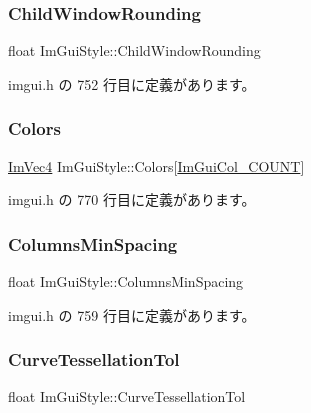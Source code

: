 \subsubsection{\texorpdfstring{Child\+Window\+Rounding}{ChildWindowRounding}}
{\footnotesize\ttfamily float Im\+Gui\+Style\+::\+Child\+Window\+Rounding}



 imgui.\+h の 752 行目に定義があります。

\mbox{\label{struct_im_gui_style_a2b4941240a38d1300c39a7fa4f03d0a3}} 
\subsubsection{\texorpdfstring{Colors}{Colors}}
{\footnotesize\ttfamily \mbox{\hyperlink{struct_im_vec4}{Im\+Vec4}} Im\+Gui\+Style\+::\+Colors\mbox{[}\mbox{\hyperlink{imgui_8h_a8e46ef7d0c76fbb1916171edfa4ae9e7ac911e17bec14cc3339cf3901a197628b}{Im\+Gui\+Col\+\_\+\+C\+O\+U\+NT}}\mbox{]}}



 imgui.\+h の 770 行目に定義があります。

\mbox{\label{struct_im_gui_style_a8fed04481e1d75bb95c97819f545e2ba}} 
\subsubsection{\texorpdfstring{Columns\+Min\+Spacing}{ColumnsMinSpacing}}
{\footnotesize\ttfamily float Im\+Gui\+Style\+::\+Columns\+Min\+Spacing}



 imgui.\+h の 759 行目に定義があります。

\mbox{\label{struct_im_gui_style_a41eb9377b63b8b85ab807c28e00198e9}} 
\subsubsection{\texorpdfstring{Curve\+Tessellation\+Tol}{CurveTessellationTol}}
{\footnotesize\ttfamily float Im\+Gui\+Style\+::\+Curve\+Tessellation\+Tol}



